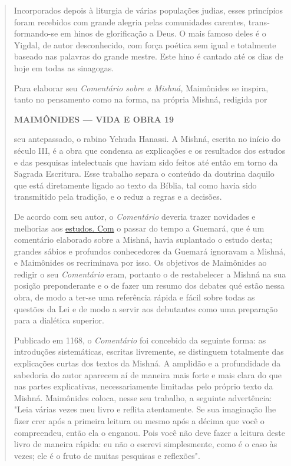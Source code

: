 \begin{quote}
Incorporados depois à liturgia de várias populações judias, esses
prin­cípios foram recebidos com grande alegria pelas comunidades
carentes, trans­formando-se em hinos de glorificação a Deus. O mais
famoso deles é o Yigdal, de autor desconhecido, com força poética sem
igual e totalmente baseado nas palavras do grande mestre. Este hino é
cantado até os dias de hoje em todas as sinagogas.

Para elaborar seu \emph{Comentário sobre a Mishná,} Maimônides se
inspi­ra, tanto no pensamento como na forma, na própria Mishná, redigida
por

\textbf{MAIMÔNIDES --- VIDA E OBRA 19}

seu antepassado, o rabino Yehuda Hanassi. A Mishná, escrita no início do
sécu­lo III, é a obra que condensa as explicações e os resultados dos
estudos e das pesquisas intelectuais que haviam sido feitos até então em
torno da Sagrada Es­critura. Esse trabalho separa o conteúdo da doutrina
daquilo que está direta­mente ligado ao texto da Bíblia, tal como havia
sido transmitido pela tradição, e o reduz a regras e a decisões.

De acordo com seu autor, o \emph{Comentário} deveria trazer novidades e
melhorias aos \href{http://estudos.Com}{{estudos. Com}} o passar do
tempo a Guemará, que é um comen­tário elaborado sobre a Mishná, havia
suplantado o estudo desta; grandes sá­bios e profundos conhecedores da
Guemará ignoravam a Mishná, e Maimôni­des os recriminava por isso. Os
objetivos de Maimônides ao redigir o seu \emph{Co­mentário} eram,
portanto o de restabelecer a Mishná na sua posição preponde­rante e o de
fazer um resumo dos debates qué estão nessa obra, de modo a ter-se uma
referência rápida e fácil sobre todas as questões da Lei e de modo a
servir aos debutantes como uma preparação para a dialética superior.

Publicado em 1168, o \emph{Comentário} foi concebido da seguinte for­ma:
as introduções sistemáticas, escritas livremente, se distinguem
totalmente das explicações curtas dos textos da Mishná. A amplidão e a
profundidade da sabedoria do autor aparecem aí de maneira mais forte e
mais clara do que nas partes explicativas, necessariamente limitadas
pelo próprio texto da Mishná. Mai­mônides coloca, nesse seu trabalho, a
seguinte advertência: "Leia várias vezes meu livro e reflita
atentamente. Se sua imaginação lhe fizer crer após a primeira leitura ou
mesmo após a décima que você o compreendeu, então ela o enga­nou. Pois
você não deve fazer a leitura deste livro de maneira rápida: eu não o
escrevi simplesmente, como é o caso às vezes; ele é o fruto de muitas
pesqui­sas e reflexões".


\end{quote}
